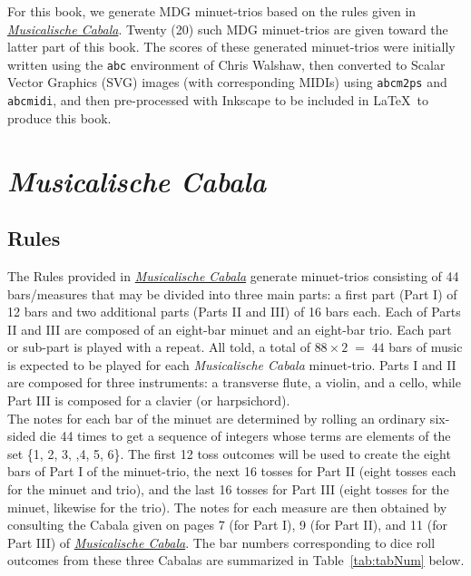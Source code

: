 \documentclass[a4paper,x11names,svgnames,10pt]{article}
\begin{document}
{For this book, we generate MDG minuet-trios based on the rules given in \href{https://imslp.org/wiki/Musicalische_Cabala_(Schola\%2C_Franciscus)}{{\em Musicalische Cabala}}. Twenty (20) such MDG minuet-trios are given toward the latter part of this book. The scores of these generated minuet-trios were initially written using the \texttt{abc} environment of Chris Walshaw, then converted to Scalar Vector Graphics (SVG) images (with corresponding MIDIs) using {\tt abcm2ps} and {\tt abcmidi}, and then pre-processed with Inkscape to be included in \LaTeX\ to produce this book.


\section{\em Musicalische Cabala}

\subsection{Rules}\label{mdgRules}

The Rules provided in \href{https://imslp.org/wiki/Musicalische_Cabala_(Schola\%2C_Franciscus)}{{\em Musicalische Cabala}} generate minuet-trios consisting of 44 bars/measures that may be divided into three main parts: a first part (Part I) of 12 bars and two additional parts (Parts II and III) of 16 bars each. Each of  Parts II and III are composed of an eight-bar minuet and an eight-bar trio.  Each part or sub-part is played with a repeat. All told, a total of $88 \times 2 \;=\; 44$ bars of music is expected to be played for each {\it Musicalische Cabala} minuet-trio. Parts I and II are composed for three instruments: a transverse flute, a violin, and a cello, while Part III is composed for a clavier (or harpsichord).\\

The notes for each bar of the minuet are determined by rolling an ordinary six-sided die 44 times to get a sequence of integers whose terms are elements of the set \{1, 2, 3, ,4, 5, 6\}. The first 12 toss outcomes will be used to create the eight bars of Part I of the minuet-trio, the next 16 tosses for Part II (eight tosses each for the minuet and trio), and the last 16 tosses for Part III (eight tosses for the minuet, likewise for the trio). The notes for each measure are then obtained by consulting the Cabala given on pages 7 (for Part I), 9 (for Part II), and 11 (for Part III) of \href{https://imslp.org/wiki/Musicalische_Cabala_(Schola\%2C_Franciscus)}{{\em Musicalische Cabala}}. The bar numbers corresponding to dice roll outcomes from these three Cabalas are summarized in Table~\ref{tab:tabNum} below.

}
\end{document}
